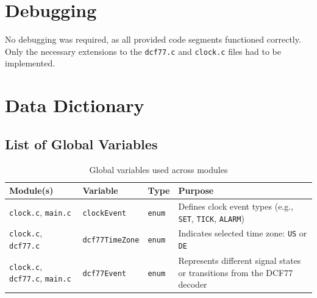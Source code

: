 \documentclass[a4paper,12pt]{article}
\begin{document}
\newpage


\section{Debugging}

No debugging was required, as all provided code segments functioned correctly.  
Only the necessary extensions to the \texttt{dcf77.c} and \texttt{clock.c} files had to be implemented.

\newpage


\section{Data Dictionary}


\subsection{List of Global Variables}

\begin{table}[H]
\centering
\renewcommand{\arraystretch}{1.3}
\begin{tabularx}{\textwidth}{|L{3.5cm}|L{2.8cm}|L{1.8cm}|X|}
\hline
\textbf{Module(s)} & \textbf{Variable} & \textbf{Type} & \textbf{Purpose} \\
\hline
\texttt{clock.c}, \texttt{main.c} & \texttt{clockEvent} & \texttt{enum} & Defines clock event types (e.g., \texttt{SET}, \texttt{TICK}, \texttt{ALARM}) \\
\hline
\texttt{clock.c}, \texttt{dcf77.c} & \texttt{dcf77TimeZone} & \texttt{enum} & Indicates selected time zone: \texttt{US} or \texttt{DE} \\
\hline
\texttt{clock.c}, \texttt{dcf77.c}, \texttt{main.c} & \texttt{dcf77Event} & \texttt{enum} & Represents different signal states or transitions from the DCF77 decoder \\
\hline
\end{tabularx}
\caption{Global variables used across modules}
\end{table}

\end{document}
